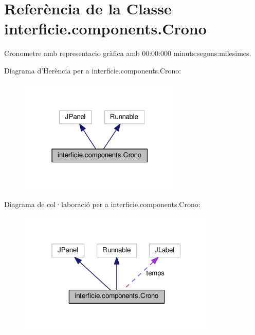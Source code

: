 \hypertarget{classinterficie_1_1components_1_1_crono}{\section{Referència de la Classe interficie.\+components.\+Crono}
\label{classinterficie_1_1components_1_1_crono}
}


Cronometre amb representacio gràfica amb 00\+:00\+:000 minuts\+:segons\+:milesimes.  




Diagrama d'Herència per a interficie.\+components.\+Crono\+:\nopagebreak
\begin{figure}[H]
\begin{center}
\leavevmode
\includegraphics[width=219pt]{classinterficie_1_1components_1_1_crono__inherit__graph}
\end{center}
\end{figure}


Diagrama de col·laboració per a interficie.\+components.\+Crono\+:\nopagebreak
\begin{figure}[H]
\begin{center}
\leavevmode
\includegraphics[width=267pt]{classinterficie_1_1components_1_1_crono__coll__graph}
\end{center}
\end{figure}
